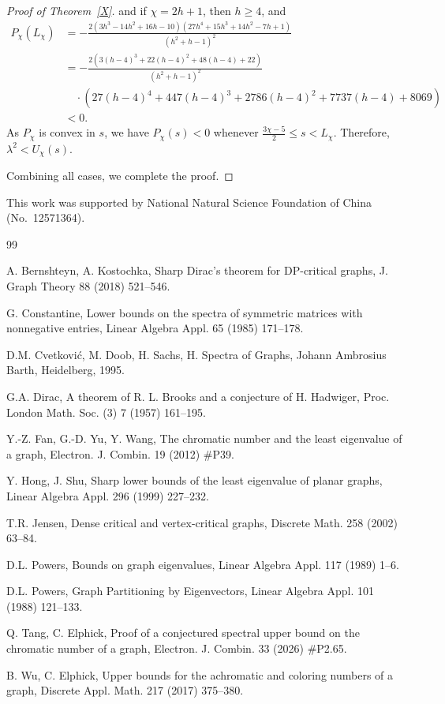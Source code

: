 \documentclass[12pt]{article}
\begin{document}
\begin{proof}[Proof of Theorem~\ref{X}]
and if $\chi=2h+1$, then $h\ge 4$, and  
\begin{align*}
P_\chi(L_\chi)&=-\frac{2(3h^3-14h^2+16h-10)(27h^4+15h^3+14h^2-7h+1)}{(h^2+h-1)^2}\\
&=-\frac{2\left(3(h-4)^3+22(h-4)^2+48(h-4)+22\right)}{(h^2+h-1)^2}\\
&\quad \cdot \left( 27(h-4)^4+447(h-4)^3+2786(h-4)^2+7737(h-4)+8069\right)\\
&<0.
\end{align*} 
As $P_\chi$ is convex in $s$, we have $P_\chi(s)<0$ whenever $\frac{3\chi-5}{2}\le s<L_\chi$. Therefore, $\lambda^2<U_\chi(s)$. %

Combining all cases, we complete the proof.
\end{proof}



\bigskip
{} 
This work was supported by National Natural Science Foundation of China (No.~12571364).

\begin{thebibliography}{99}

A. Bernshteyn, A. Kostochka,
Sharp Dirac's theorem for DP-critical graphs,
J. Graph Theory 88 (2018) 521--546.

 G. Constantine,
Lower bounds on the spectra of symmetric matrices with nonnegative entries, Linear Algebra Appl.  65 (1985) 171--178.

D.M. Cvetkovi\'{c}, M.  Doob, H. Sachs, H. Spectra of Graphs,  Johann Ambrosius Barth, Heidelberg, 1995.


G.A. Dirac,
A theorem of R. L. Brooks and a conjecture of H. Hadwiger,
Proc. London Math. Soc. (3) 7 (1957) 161--195.

Y.-Z. Fan, G.-D. Yu, Y. Wang,
The chromatic number and the least eigenvalue of a graph,
Electron. J. Combin. 19 (2012) \#P39.


Y. Hong, J. Shu, Sharp lower bounds of the least eigenvalue of planar graphs, Linear Algebra Appl.  296 (1999) 227--232.

T.R. Jensen,  Dense critical and vertex-critical graphs, Discrete Math. 258 (2002) 63--84.

D.L. Powers,
Bounds on graph eigenvalues,
Linear Algebra Appl. 117 (1989) 1--6.



D.L. Powers, 
Graph Partitioning by Eigenvectors,  Linear Algebra Appl.  101 (1988) 121--133.


Q. Tang, C. Elphick,
Proof of a conjectured spectral upper bound on the chromatic number of a graph,
Electron. J. Combin. 33 (2026) \#P2.65.

B. Wu, C. Elphick,
Upper bounds for the achromatic and coloring numbers of a graph,
Discrete Appl. Math. 217 (2017) 375--380.



\end{thebibliography}
\end{document}
